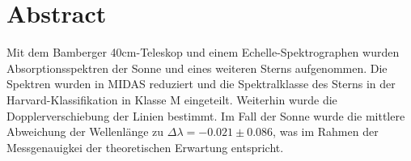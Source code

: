 \section{Abstract}
Mit dem Bamberger 40cm-Teleskop und einem Echelle-Spektrographen wurden Absorptionsspektren der Sonne und eines weiteren Sterns aufgenommen. Die Spektren wurden in MIDAS reduziert und die Spektralklasse des Sterns in der Harvard-Klassifikation in Klasse M eingeteilt. Weiterhin wurde die Dopplerverschiebung der Linien bestimmt. Im Fall der Sonne wurde die mittlere Abweichung der Wellenlänge zu $\Delta\lambda = -0.021 \pm 0.086$, was im Rahmen der Messgenauigkei der theoretischen Erwartung entspricht.